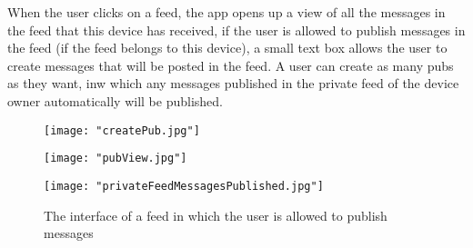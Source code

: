 When the user clicks on a feed, the app opens up a view of all the messages in the feed that this device has received, if the user is allowed to publish messages in the feed (if the feed belongs to this device), a small text box allows the user to create messages that will be posted in the feed. A user can create as many pubs as they want, inw which any messages published in the private feed of the device owner automatically will be published. 
\begin{figure}
	\centering
	\begin{minipage}{.5\textwidth}
		\centering
		\texttt{[image: "createPub.jpg"]}
		\label{fig:pub1}
	\end{minipage}%
	\begin{minipage}{.5\textwidth}
		\centering
		\texttt{[image: "pubView.jpg"]}
		\label{fig:pub2}
	\end{minipage}
\end{figure}

\begin{figure}[!h]
	\centering
	\texttt{[image: "privateFeedMessagesPublished.jpg"]}
	\caption{The interface of a feed in which the user is allowed to publish messages}
	\label{fig:FeedView}
\end{figure}

